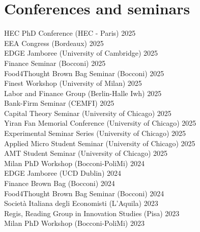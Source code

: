 \documentclass[A4,11pt]{article}
\begin{document}
\section{Conferences and seminars}
\hspace{12pt} HEC PhD Conference (HEC - Paris) \hfill 2025\\
\smallskip
\hspace{12pt} EEA Congress (Bordeaux) \hfill 2025\\
\smallskip
\hspace{12pt} EDGE Jamboree (University of Cambridge) \hfill 2025\\
\smallskip
\hspace{12pt} Finance Seminar (Bocconi) \hfill 2025\\
\smallskip
\hspace{12pt} Food4Thought Brown Bag Seminar (Bocconi) \hfill 2025\\
\smallskip
\hspace{12pt} Finest Workshop (University of Milan) \hfill 2025\\
\smallskip
\hspace{12pt} Labor and Finance Group (Berlin-Halle Iwh) \hfill 2025\\
\smallskip
\hspace{12pt} Bank-Firm Seminar (CEMFI) \hfill 2025\\
\smallskip
\hspace{12pt} Capital Theory Seminar (University of Chicago) \hfill 2025\\
\smallskip
\hspace{12pt} Yiran Fan Memorial Conference (University of Chicago) \hfill 2025\\
\smallskip
\hspace{12pt} Experimental Seminar Series (University of Chicago) \hfill 2025\\
\smallskip
\hspace{12pt} Applied Micro Student Seminar (University of Chicago) \hfill 2025\\
\smallskip
\hspace{12pt} AMT Student Seminar (University of Chicago) \hfill 2025\\
\smallskip
\hspace{12pt} Milan PhD Workshop (Bocconi-PoliMi) \hfill 2024\\
\smallskip
\hspace{12pt} EDGE Jamboree (UCD Dublin) \hfill 2024\\
\smallskip
\hspace{12pt} Finance Brown Bag (Bocconi) \hfill 2024\\
\smallskip
\hspace{12pt} Food4Thought Brown Bag Seminar (Bocconi) \hfill 2024\\
\smallskip
\hspace{12pt} Società Italiana degli Economisti (L'Aquila) \hfill 2023\\
\smallskip
\hspace{12pt} Regis, Reading Group in Innovation Studies (Pisa) \hfill 2023\\
\smallskip
\hspace{12pt} Milan PhD Workshop (Bocconi-PoliMi) \hfill 2023\\
\end{document}

